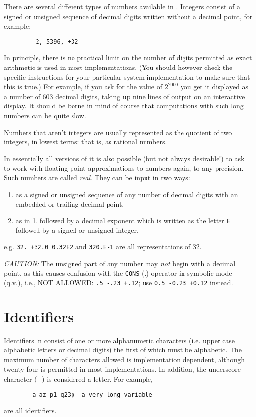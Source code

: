 There are several different types of numbers available in
\REDUCE.  Integers consist of a signed or unsigned sequence of decimal
digits written without a decimal point, for example:
\begin{verbatim}
        -2, 5396, +32
\end{verbatim}
In principle, there is no practical limit on the number of digits
permitted as exact arithmetic is used in most implementations. (You should
however check the specific instructions for your particular system
implementation to make sure that this is true.) For example, if you ask
for the value of $2^{2000}$ you get it
displayed as a number of 603 decimal digits, taking up nine lines of
output on an interactive display.  It should be borne in mind of course
that computations with such long numbers can be quite slow.

Numbers that aren't integers are usually represented as the quotient of
two integers, in lowest terms: that is, as rational numbers.

In essentially all versions of {\REDUCE} it is also possible (but not always
desirable!) to ask {\REDUCE} to work with floating point approximations to
numbers again, to any precision. Such numbers are called {\em real}.
  They can be input in two ways:
\begin{enumerate}
\item as a signed or unsigned sequence of any number of decimal digits
      with an embedded or trailing decimal point.
\item as in 1. followed by a decimal exponent which is written as the
      letter {\tt E} followed by a signed or unsigned integer.
\end{enumerate}
e.g. {\tt 32. +32.0 0.32E2} and {\tt 320.E-1} are all representations of
32.

{\it CAUTION:}  The unsigned part of any number may {\em not}
begin with a decimal point, as this causes confusion with the {\tt CONS} (.)
operator in symbolic mode (q.v.), i.e., NOT ALLOWED: {\tt .5  -.23  +.12};
use {\tt 0.5 -0.23 +0.12} instead.

\section{Identifiers}

Identifiers in {\REDUCE} consist of one or more
alphanumeric characters (i.e. upper case alphabetic letters or decimal
digits) the first of which must be alphabetic.  The maximum number of
characters allowed is implementation dependent, although twenty-four is
permitted in most implementations.  In addition, the underscore character
(\_) is considered a letter. For example,
\begin{verbatim}
        a az p1 q23p  a_very_long_variable
\end{verbatim}
are all identifiers.

